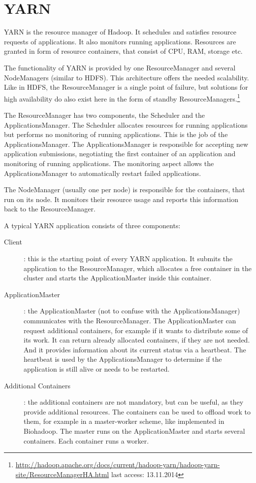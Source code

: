 \section{YARN}
\label{chap:hadoop:yarn}
YARN is the resource manager of Hadoop. It schedules and satisfies resource requests of applications. It also monitors running applications. Resources are granted in form of resource containers, that consist of CPU, RAM, storage etc.

The functionality of YARN is provided by one ResourceManager and several NodeManagers (similar to HDFS). This architecture offers the needed scalability. Like in HDFS, the ResourceManager is a single point of failure, but solutions for high availability do also exist here in the form of standby ResourceManagers.\footnote{\url{http://hadoop.apache.org/docs/current/hadoop-yarn/hadoop-yarn-site/ResourceManagerHA.html} last access: 13.11.2014}

The ResourceManager has two components, the Scheduler and the ApplicationsManager. The Scheduler allocates resources for running applications but performs no monitoring of running applications. This is the job of the ApplicationsManager. The ApplicationsManager is responsible for accepting new application submissions, negotiating the first container of an application and monitoring of running applications. The monitoring aspect allows the ApplicationsManager to automatically restart failed applications.

The NodeManager (usually one per node) is responsible for the containers, that run on its node. It monitors their resource usage and reports this information back to the ResourceManager.

A typical YARN application consists of three components:

\begin{description}
  \item[Client]: this is the starting point of every YARN application. It submits the application to the ResourceManager, which allocates a free container in the cluster and starts the ApplicationMaster inside this container.
  \item[ApplicationMaster]: the ApplicationMaster (not to confuse with the ApplicationsManager) communicates with the ResourceManager. The ApplicationMaster can request additional containers, for example if it wants to distribute some of its work. It can return already allocated containers, if they are not needed. And it provides information about its current status via a heartbeat. The heartbeat is used by the ApplicationsManager to determine if the application is still alive or needs to be restarted.
  \item[Additional Containers]: the additional containers are not mandatory, but can be useful, as they provide additional resources. The containers can be used to offload work to them, for example in a master-worker scheme, like implemented in Biohadoop. The master runs on the ApplicationMaster and starts several containers. Each container runs a worker.
\end{description}

